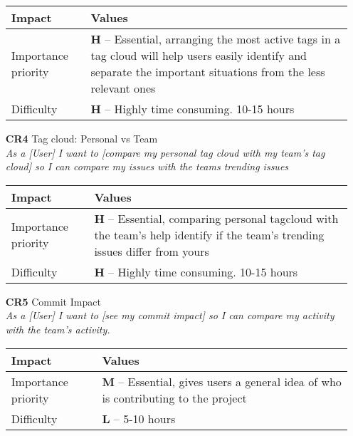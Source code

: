 \begin{itemize}
        \begin{tabular}{| l | p{8cm} |}
            \hline
            \rowcolor[gray]{0.8}
            \textbf{Impact} & \textbf{Values} \\
            \hline
            Importance priority & \textbf{H} -- Essential, arranging the most active tags in a tag cloud will help users easily identify and separate the important situations from the less relevant ones\\
            Difficulty & \textbf{H} -- Highly time consuming. 10-15 hours\\
            \hline
        \end{tabular}
    \vspace{0.5cm}

    \item[\textbf{CR4}] Tag cloud: Personal vs Team\\
        \textit{\small{As a [User] I want to [compare my personal tag cloud with my team's tag cloud] so I can compare my issues with the teams trending issues}}

        \begin{tabular}{| l | p{8cm} |}
            \hline
            \rowcolor[gray]{0.8}
            \textbf{Impact} & \textbf{Values} \\
            \hline
            Importance priority & \textbf{H} -- Essential, comparing personal tagcloud with the team's help identify if the team's trending issues differ from yours\\
            Difficulty & \textbf{H} -- Highly time consuming. 10-15 hours\\
            \hline
        \end{tabular}
    \vspace{0.5cm}

    \item[\textbf{CR5}] Commit Impact\\
        \textit{\small{As a [User] I want to [see my commit impact] so I can compare my activity with the team's activity.}}

        \begin{tabular}{| l | p{8cm} |}
            \hline
            \rowcolor[gray]{0.8}
            \textbf{Impact} & \textbf{Values} \\
            \hline
            Importance priority & \textbf{M} -- Essential, gives users a general idea of who is contributing to the project\\
            Difficulty & \textbf{L} -- 5-10 hours\\
            \hline
        \end{tabular}
    \vspace{0.5cm}


\end{itemize}
